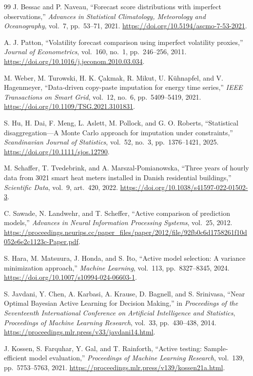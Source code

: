 \documentclass[12pt]{article}
\begin{document}
\begin{thebibliography}{99}
 J. Bessac and P. Naveau, ``Forecast score distributions
with imperfect observations,'' \emph{Advances in Statistical Climatology,
Meteorology and Oceanography}, vol.~7, pp.~53--71, 2021.
\url{https://doi.org/10.5194/ascmo-7-53-2021}.

 A. J. Patton, ``Volatility forecast comparison using
imperfect volatility proxies,'' \emph{Journal of Econometrics}, vol.~160,
no.~1, pp.~246--256, 2011. \url{https://doi.org/10.1016/j.jeconom.2010.03.034}.

 M. Weber, M. Turowski, H. K. \c{C}akmak, R. Mikut,
U. K\"uhnapfel, and V. Hagenmeyer, ``Data-driven copy-paste imputation
for energy time series,'' \emph{IEEE Transactions on Smart Grid},
vol.~12, no.~6, pp.~5409--5419, 2021.
\url{https://doi.org/10.1109/TSG.2021.3101831}.

 S. Hu, H. Dai, F. Meng, L. Aslett, M. Pollock, and
G. O. Roberts, ``Statistical disaggregation---A Monte Carlo approach
for imputation under constraints,'' \emph{Scandinavian Journal of
Statistics}, vol.~52, no.~3, pp.~1376--1421, 2025.
\url{https://doi.org/10.1111/sjos.12790}.

 M. Schaffer, T. Tvedebrink, and A. Marszal-Pomianowska,
``Three years of hourly data from 3021 smart heat meters installed in
Danish residential buildings,'' \emph{Scientific Data}, vol.~9,
art.~420, 2022. \url{https://doi.org/10.1038/s41597-022-01502-3}.

 C. Sawade, N. Landwehr, and T. Scheffer,
``Active comparison of prediction models,''
\emph{Advances in Neural Information Processing Systems}, vol.~25, 2012.
\url{https://proceedings.neurips.cc/paper_files/paper/2012/file/92fb0c6d1758261f10d052e6e2c1123c-Paper.pdf}.

 S. Hara, M. Matsuura, J. Honda, and S. Ito,
``Active model selection: A variance minimization approach,''
\emph{Machine Learning}, vol.~113, pp.~8327--8345, 2024.
\url{https://doi.org/10.1007/s10994-024-06603-1}.

 S. Javdani, Y. Chen, A. Karbasi, A. Krause,
D. Bagnell, and S. Srinivasa, ``Near Optimal Bayesian Active Learning for
Decision Making,'' in \emph{Proceedings of the Seventeenth International
Conference on Artificial Intelligence and Statistics}, \emph{Proceedings
of Machine Learning Research}, vol.~33, pp.~430--438, 2014.
\url{https://proceedings.mlr.press/v33/javdani14.html}.

 J. Kossen, S. Farquhar, Y. Gal, and
T. Rainforth, ``Active testing: Sample-efficient model evaluation,''
\emph{Proceedings of Machine Learning Research}, vol.~139,
pp.~5753--5763, 2021.
\url{https://proceedings.mlr.press/v139/kossen21a.html}.


\end{thebibliography}
\end{document}
